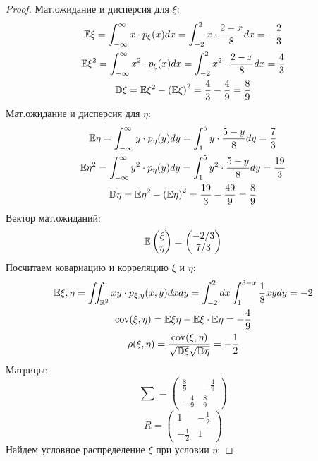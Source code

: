\begin{proof}
Мат.ожидание и дисперсия для $\xi$:
\begin{gather*}
    \mathbb E\xi = \int_{-\infty}^{\infty}x\cdot p_{\xi}(x)dx = \int_{-2}^{2}x\cdot\frac{2-x}{8}dx = -\frac{2}{3}\\
    \mathbb E\xi^2 = \int_{-\infty}^{\infty}x^2\cdot p_{\xi}(x)dx = \int_{-2}^{2}x^2\cdot\frac{2-x}{8}dx = \frac{4}{3}\\
    \mathbb D\xi = \mathbb E\xi^2 - \left(\mathbb E\xi\right)^2 = \frac{4}{3} - \frac{4}{9} = \frac{8}{9}
\end{gather*}
Мат.ожидание и дисперсия для $\eta$:
\begin{gather*}
    \mathbb E\eta = \int_{-\infty}^{\infty}y\cdot p_{\eta}(y)dy = \int_{1}^{5}y\cdot\frac{5-y}{8}dy = \frac{7}{3}\\
    \mathbb E\eta^2 = \int_{-\infty}^{\infty}y^2\cdot p_{\eta}(y)dy = \int_{1}^{5}y^2\cdot\frac{5-y}{8}dy = \frac{19}{3}\\
    \mathbb D\eta = \mathbb E\eta^2 - \left(\mathbb E\eta\right)^2 = \frac{19}{3} - \frac{49}{9} = \frac{8}{9}
\end{gather*}
Вектор мат.ожиданий:\\
\[
\mathbb E\begin{pmatrix} \xi \\ \eta \end{pmatrix} = \begin{pmatrix} -2/3 \\ 7/3 \end{pmatrix}
\]
Посчитаем ковариацию и корреляцию $\xi$ и $\eta$:
\begin{gather*}
\mathbb E\xi,\eta = \iint_{\operatorname{\mathbb{R}}^2}xy\cdot p_{\xi,\eta}(x,y)dxdy = \int_{-2}^{2}dx\int_{1}^{3-x}\frac{1}{8}xydy = -2\\
\operatorname{\mathop{cov}}(\xi, \eta) = \mathbb E\xi\eta - \mathbb E\xi\cdot\mathbb E\eta = -\frac{4}{9}\\
\rho(\xi,\eta) = \frac{\operatorname{\mathop{cov}}(\xi,\eta)}{\sqrt{\mathbb D\xi}\sqrt{\mathbb D\eta}} = -\frac{1}{2}
\end{gather*}
Матрицы:
\[
\sum = \begin{pmatrix}
\frac{8}{9} & -\frac{4}{9} \\
-\frac{4}{9} & \frac{8}{9}
\end{pmatrix}
\]
\[
R = \begin{pmatrix}
1 & -\frac{1}{2} \\
-\frac{1}{2} & 1
\end{pmatrix}
\]
Найдем условное распределение $\xi$ при условии $\eta$:

\end{proof}

